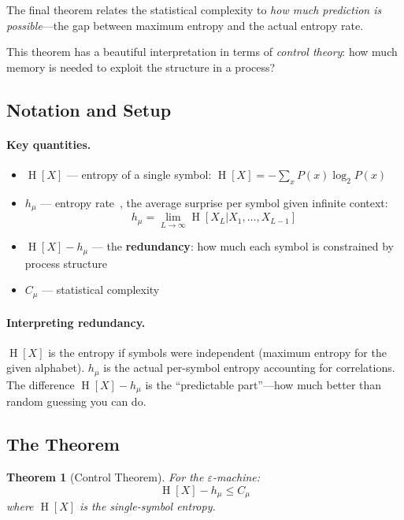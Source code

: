 \documentclass[11pt,a4paper]{article}
\theoremstyle{definition}
\theoremstyle{plain}
\newtheorem{theorem}{Theorem}[section]
\newcommand{\eps}{\varepsilon}
\newcommand{\Cmu}{C_\mu}
\newcommand{\hmu}{h_\mu}
\DeclareMathOperator{\Ent}{H}
\begin{document}
The final theorem relates the statistical complexity to \emph{how much prediction is possible}---the gap between maximum entropy and the actual entropy rate.

This theorem has a beautiful interpretation in terms of \emph{control theory}: how much memory is needed to exploit the structure in a process?

\subsection{Notation and Setup}

\paragraph{Key quantities.}
\begin{itemize}[nosep]
    \item $\Ent[X]$ --- entropy of a single symbol: $\Ent[X] = -\sum_x P(x) \log_2 P(x)$
    \item $\hmu$ --- entropy rate~\cite{cover2006elements}, the average surprise per symbol given infinite context:
    \begin{equation}
        \hmu = \lim_{L \to \infty} \Ent[X_L | X_1, \ldots, X_{L-1}]
    \end{equation}
    \item $\Ent[X] - \hmu$ --- the \textbf{redundancy}: how much each symbol is constrained by process structure
    \item $\Cmu$ --- statistical complexity
\end{itemize}

\paragraph{Interpreting redundancy.}
$\Ent[X]$ is the entropy if symbols were independent (maximum entropy for the given alphabet). $\hmu$ is the actual per-symbol entropy accounting for correlations. The difference $\Ent[X] - \hmu$ is the ``predictable part''---how much better than random guessing you can do.

\subsection{The Theorem}

\begin{theorembox}[title=Theorem 6: Control~\cite{shalizi2001computational}]
\begin{theorem}[Control Theorem]
\label{thm:control}
For the $\eps$-machine:
\begin{equation}
    \Ent[X] - \hmu \leq \Cmu
\end{equation}
where $\Ent[X]$ is the single-symbol entropy.
\end{theorem}
\end{theorembox}
\end{document}
